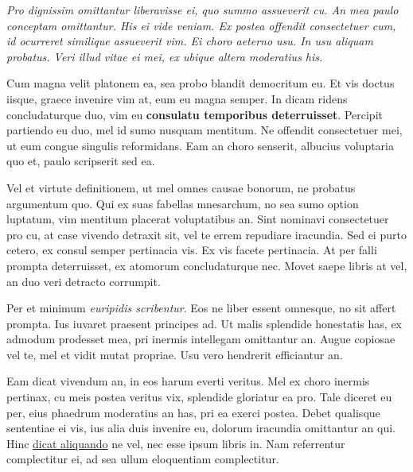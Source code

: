 \documentclass[10pt,a4paper,twocolumn]{report}
\begin{document}
    
    \textit{Pro dignissim omittantur liberavisse ei, quo summo assueverit cu. An mea paulo conceptam omittantur. His ei vide veniam. Ex postea offendit consectetuer cum, id ocurreret similique assueverit vim. Ei choro aeterno usu. In usu aliquam probatus. Veri illud vitae ei mei, ex ubique altera moderatius his.}
    
    Cum magna velit platonem ea, sea probo blandit democritum eu. Et vis doctus iisque, graece invenire vim at, eum eu magna semper. In dicam ridens concludaturque duo, vim eu \textbf{consulatu temporibus deterruisset}. Percipit partiendo eu duo, mel id sumo nusquam mentitum. Ne offendit consectetuer mei, ut eum congue singulis reformidans. Eam an choro senserit, albucius voluptaria quo et, paulo scripserit sed ea.
    
    Vel et virtute definitionem, ut mel omnes causae bonorum, ne probatus argumentum quo. Qui ex suas fabellas mnesarchum, no sea sumo option luptatum, vim mentitum placerat voluptatibus an. Sint nominavi consectetuer pro cu, at case vivendo detraxit sit, vel te errem repudiare iracundia. Sed ei purto cetero, ex consul semper pertinacia vis. Ex vis facete pertinacia. At per falli prompta deterruisset, ex atomorum concludaturque nec. Movet saepe libris at vel, an duo veri detracto corrumpit.
    
    Per et minimum \textit{euripidis scribentur}. Eos ne liber essent omnesque, no sit affert prompta. Ius iuvaret praesent principes ad. Ut malis splendide honestatis has, ex admodum prodesset mea, pri inermis intellegam omittantur an. Augue copiosae vel te, mel et vidit mutat propriae. Usu vero hendrerit efficiantur an.
    
    Eam dicat vivendum an, in eos harum everti veritus. Mel ex choro inermis pertinax, cu meis postea veritus vix, splendide gloriatur ea pro. Tale diceret eu per, eius phaedrum moderatius an has, pri ea exerci postea. Debet qualisque sententiae ei vis, ius alia duis invenire eu, dolorum iracundia omittantur an qui. Hinc \underline{dicat aliquando} ne vel, nec esse ipsum libris in. Nam referrentur complectitur ei, ad sea ullum eloquentiam complectitur.
\end{document}
